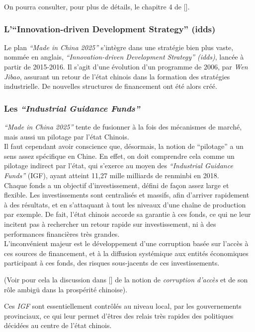 \documentclass[a4paper]{article}
\begin{document}
On pourra consulter, pour plus de détails, le chapitre 4 de [\cite{heilmann17_chinas}].
\subsubsection{L’“Innovation-driven Development Strategy” (idds)}
\label{sec:org3a525f5}
    Le plan \emph{“Made in China 2025”} s’intègre dans une stratégie bien plus vaste,
nommée en anglais, \emph{“Innovation-driven Development Strategy” (idds)}, lancée à
partir de 2015-2016. Il s’agit d’une évolution d’un programme de 2006, par \emph{Wen
Jibao}, assurant un retour de l’état chinois dans la formation des stratégies
industrielle. De nouvelles structures de financement ont été alors créé.
\subsubsection{Les \emph{“Industrial Guidance Funds”}}
\label{sec:org4650fde}
\emph{“Made in China 2025”} tente de fusionner à la fois des mécanismes de
marché, mais aussi un pilotage par l’état Chinois.\\

Il faut cependant avoir conscience que, désormais, la notion de “pilotage” a un
sens assez spécifique en Chine. En effet, on doit comprendre cela comme un
pilotage indirect par l’état, qui s’exerce au moyen des \emph{“Industrial Guidance
Funds”} (IGF), ayant atteint 11,27 mille milliards de renminbi en 2018. \\

Chaque fonds a un objectif d’investissement, défini de façon assez large et
flexible. Les investissements sont centralisés et massifs, afin d’arriver
rapidement à des résultats, et en s’attaquant à tout les niveaux d’une chaîne de
production par exemple. De fait, l’état chinois accorde sa garantie à ces fonds,
ce qui ne leur incitent pas à rechercher un retour rapide sur investissement, ni à
des performances financières très grandes.\\

 L’inconvénient majeur est le développement d’une corruption basée sur l’accès à
ces sources de financement, et à la diffusion systémique aux entités économiques
participant à ces fonds, des risques sous-jacents de ces investissements. 

(Voir pour cela la discussion dans [\cite{ang20_chinas}] de la notion de
\emph{corruption d’accès} et de son rôle ambigü dans la prospérité chinoise).

 Ces \emph{IGF} sont essentiellement contrôlés au niveau local, par les gouvernements
provinciaux, ce qui leur permet d’êtres des relais très rapides des politiques
décidées au centre de l’état chinois.\\
\end{document}
